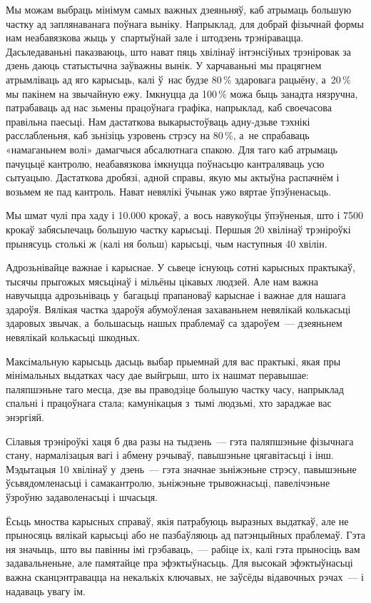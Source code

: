 Мы можам выбраць мінімум самых важных дзеяньняў, каб атрымаць большую частку ад заплянаванага поўнага выніку. Напрыклад, для добрай фізычнай формы нам неабавязкова жыць у~спартыўнай зале і штодзень трэніравацца. Дасьледаваньні паказваюць, што нават пяць хвілінаў інтэнсіўных трэніровак за дзень даюць статыстычна заўважны вынік. У харчаваньні мы працягнем атрымліваць ад яго карысьць, калі ў~нас будзе 80\,\% здаровага рацыёну, а~20\,\% мы пакінем на звычайную ежу. Імкнуцца да 100\,\% можа быць занадта нязручна, патрабаваць ад нас зьмены працоўнага графіка, напрыклад, каб своечасова правільна паесьці. Нам дастаткова выкарыстоўваць адну-дзьве тэхнікі расслабленьня, каб зьнізіць узровень стрэсу на 80\,\%, а~не спрабаваць «намаганьнем волі» дамагчыся абсалютнага спакою. Для таго каб атрымаць пачуцьцё кантролю, неабавязкова імкнуцца поўнасьцю кантраляваць усю сытуацыю. Дастаткова дробязі, адной справы, якую мы актыўна распачнём і возьмем яе пад кантроль. Нават невялікі ўчынак ужо вяртае ўпэўненасьць.

Мы шмат чулі пра хаду і 10.000 крокаў, а~вось навукоўцы ўпэўненыя, што і 7500 крокаў забясьпечаць большую частку карысьці. Першыя 20 хвілінаў трэніроўкі прынясуць столькі ж (калі ня больш) карысьці, чым наступныя 40 хвілін.

Адрозьнівайце важнае і карыснае. У сьвеце існуюць сотні карысных практыкаў, тысячы прыгожых мясьцінаў і мільёны цікавых людзей. Але нам важна навучыцца адрозьніваць у~багацьці прапановаў карыснае і важнае для нашага здароўя. Вялікая частка здароўя абумоўленая захаваньнем невялікай колькасьці здаровых звычак, а~большасьць нашых праблемаў са здароўем~--- дзеяньнем невялікай колькасьці шкодных.

Максімальную карысьць дасьць выбар прыемнай для вас практыкі, якая пры мінімальных выдатках часу дае выйгрыш, што іх нашмат перавышае: паляпшэньне таго месца, дзе вы праводзіце большую частку часу, напрыклад спальні і працоўнага стала; камунікацыя з~тымі людзьмі, хто зараджае вас энэргіяй.

Сілавыя трэніроўкі хаця б два разы на тыдзень~--- гэта паляпшэньне фізычнага стану, нармалізацыя вагі і абмену рэчываў, павышэньне цягавітасьці і інш. Мэдытацыя 10 хвілінаў у~дзень~--- гэта значнае зьніжэньне стрэсу, павышэньне ўсьвядомленасьці і самакантролю, зьніжэньне трывожнасьці, павелічэньне ўзроўню задаволенасьці і шчасьця.

Ёсьць мноства карысных справаў, якія патрабуюць выразных выдаткаў, але не прыносяць вялікай карысьці або не пазбаўляюць ад патэнцыйных праблемаў. Гэта ня значыць, што вы павінны імі грэбаваць,~--- рабіце іх, калі гэта прыносіць вам задавальненьне, але памятайце пра эфэктыўнасьць. Для высокай эфэктыўнасьці важна сканцэнтравацца на некалькіх ключавых, не заўсёды відавочных рэчах~--- і надаваць увагу ім.

